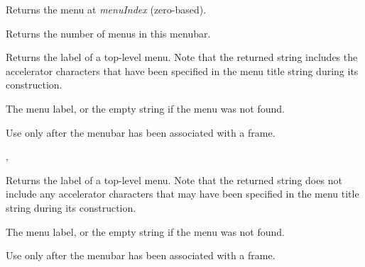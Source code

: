 \label{wxmenubargetmenu}


Returns the menu at {\it menuIndex} (zero-based).


\label{wxmenubargetmenucount}


Returns the number of menus in this menubar.


\label{wxmenubargetmenulabel}


Returns the label of a top-level menu. Note that the returned string
includes the accelerator characters that have been specified in the menu
title string during its construction.




The menu label, or the empty string if the menu was not found.


Use only after the menubar has been associated with a frame.


, 


\label{wxmenubargetmenulabeltext}


Returns the label of a top-level menu. Note that the returned string does not
include any accelerator characters that may have been specified in the menu
title string during its construction.




The menu label, or the empty string if the menu was not found.


Use only after the menubar has been associated with a frame.

